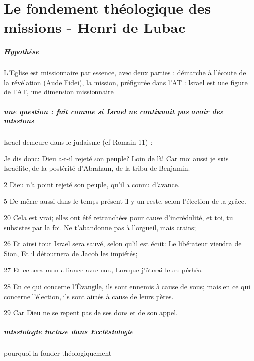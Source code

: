 \chapter{Le fondement théologique des missions - Henri de Lubac}


\paragraph{Hypothèse} L'Eglise est missionnaire par essence, avec deux parties : démarche à l'écoute de la révélation (Aude Fidei), la mission, préfigurée dans l'AT : Israel est une figure de l'AT, une dimension missionnaire

\paragraph{une question : fait comme si Israel ne continuait pas avoir des missions} Israel demeure dans le judaisme (cf Romain 11) : 
\begin{singlequote}
    Je dis donc: Dieu a-t-il rejeté son peuple? Loin de là! Car moi aussi je suis Israélite, de la postérité d'Abraham, de la tribu de Benjamin.

2 Dieu n'a point rejeté son peuple, qu'il a connu d'avance. 


5 De même aussi dans le temps présent il y un reste, selon l'élection de la grâce.
 
20 Cela est vrai; elles ont été retranchées pour cause d'incrédulité, et toi, tu subsistes par la foi. Ne t'abandonne pas à l'orgueil, mais crains;

26 Et ainsi tout Israël sera sauvé, selon qu'il est écrit: Le libérateur viendra de Sion, Et il détournera de Jacob les impiétés;

27 Et ce sera mon alliance avec eux, Lorsque j'ôterai leurs péchés.

28 En ce qui concerne l'Évangile, ils sont ennemis à cause de vous; mais en ce qui concerne l'élection, ils sont aimés à cause de leurs pères.

29 Car Dieu ne se repent pas de ses dons et de son appel.

\end{singlequote}

\paragraph{missiologie incluse dans Ecclésiologie} pourquoi la fonder théologiquement

